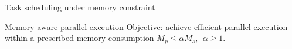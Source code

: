 \begin{frame}{Task scheduling under memory constraint}

  \vspace{-1cm}

  \begin{block}{Memory-aware parallel execution}
    \alert{Objective}: achieve efficient parallel execution within a
    prescribed memory consumption
    \alert{$M_p \le \alpha M_s,~~\alpha \ge 1$}.
  \end{block}

  
    \vspace{0.3cm}
  
    \begin{columns}
      \begin{column}{0.5\textwidth}



        \vspace{0.2cm}


\end{column}
\end{columns}
\end{frame}
